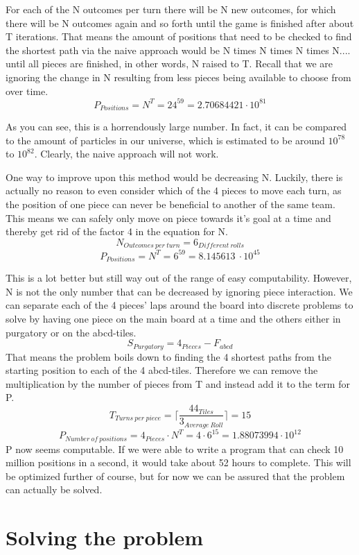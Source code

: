 \documentclass[12pt]{article} %
\begin{document}
For each of the N outcomes per turn there will be N new outcomes, for which there will be N outcomes again and so forth until the game is finished after about T iterations. That means the amount of positions that need to be checked to find the shortest path via the naive approach would be N times N times N times N.... until all pieces are finished, in other words, N raised to T. Recall that we are ignoring the change in N resulting from less pieces being available to choose from over time.
\[
    P_{Positions} =  N^T = 24^{59} = 2.70684421 \cdot 10^{81}
\]

As you can see, this is a horrendously large number. In fact, it can be compared to the amount of particles in our universe, which is estimated to be around $10^{78}$ to $10^{82}$. Clearly, the naive approach will not work.

One way to improve upon this method would be decreasing N. Luckily, there is actually no reason to even consider which of the 4 pieces to move each turn, as the position of one piece can never be beneficial to another of the same team. This means we can safely only move on piece towards it's goal at a time and thereby get rid of the factor 4 in the equation for N.
\[
    N_{Outcomes~per~turn} = 6_{Different~rolls}
\]
\[
    P_{Positions} =  N^T = 6^{59} =8.145613\ \cdot 10^{45}
\]

This is a lot better but still way out of the range of easy computability.
However, N is not the only number that can be decreased by ignoring piece interaction. We can separate each of the 4 pieces' laps around the board into discrete problems to solve by having one piece on the main board at a time and the others either in purgatory or on the abcd-tiles.
\[
    S_{Purgatory} = 4_{Pieces} - F_{abcd}
\]
That means the problem boils down to finding the 4 shortest paths from the starting position to each of the 4 abcd-tiles.
Therefore we can remove the multiplication by the number of pieces from T and instead add it to the term for P.
\[
    T_{Turns~per~piece} =  \lceil \frac{44_{Tiles}}{3_{Average~Roll}}\rceil
    =  15
\]
\[
    P_{Number~of~positions} =  4_{Pieces} \cdot N^T = 4 \cdot 6^{15} = 1.88073994 \cdot 10^{12}
\]
P now seems computable. If we were able to write a program that can check 10 million positions in a second, it would take about
52 hours to complete. This will be optimized further of course, but for now we can be assured that the problem can actually be solved.


\section{Solving the problem}
\end{document}
